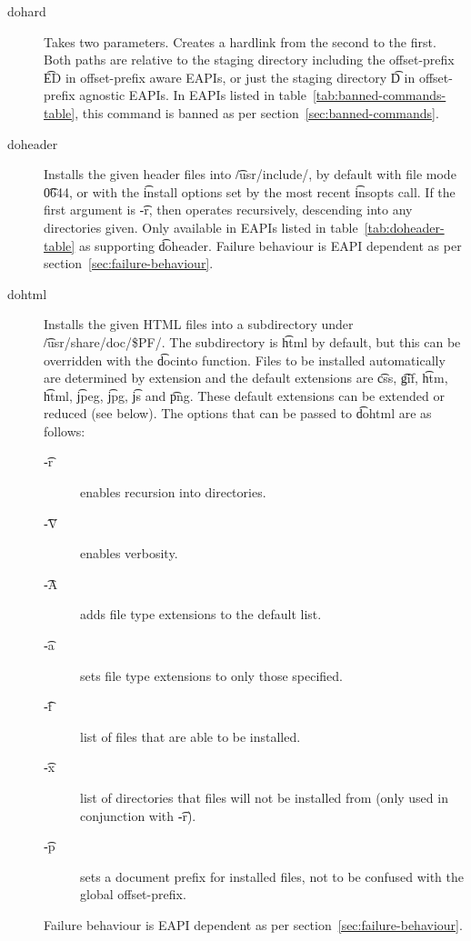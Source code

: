 \begin{description}
\item[dohard] Takes two parameters. Creates a hardlink from the second to the first. Both paths are
    relative to the staging directory including the offset-prefix \t{ED} in offset-prefix aware
    EAPIs, or just the staging directory \t{D} in offset-prefix agnostic EAPIs. In EAPIs listed
    in table~\ref{tab:banned-commands-table}, this command is banned as per
    section~\ref{sec:banned-commands}.

\item[doheader]  Installs the given header files into \t{/usr/include/},
    by default with file mode \t{0644}, or with the \t{install} options set by the most recent
    \t{insopts} call. If the first argument is \t{-r}, then operates recursively, descending
    into any directories given.
    Only available in EAPIs listed in table~\ref{tab:doheader-table} as supporting \t{doheader}.
    Failure behaviour is EAPI dependent as per section~\ref{sec:failure-behaviour}.

\item[dohtml] Installs the given HTML files into a subdirectory under \t{/usr/share/doc/\$PF/}.
    The subdirectory is \t{html} by default, but this can be overridden with the \t{docinto}
    function. Files to be installed automatically are determined by extension and the default
    extensions are \t{css}, \t{gif}, \t{htm}, \t{html}, \t{jpeg}, \t{jpg}, \t{js} and \t{png}.
    These default extensions can be extended or reduced (see below). The options that can be passed
    to \t{dohtml} are as follows:
    \begin{description}
    \item[\t{-r}] enables recursion into directories.
    \item[\t{-V}] enables verbosity.
    \item[\t{-A}] adds file type extensions to the default list.
    \item[\t{-a}] sets file type extensions to only those specified.
    \item[\t{-f}] list of files that are able to be installed.
    \item[\t{-x}] list of directories that files will not be installed from (only used in
        conjunction with \t{-r}).
    \item[\t{-p}] sets a document prefix for installed files, not to be confused with the global
        offset-prefix.
    \end{description}

    Failure behaviour is EAPI dependent as per section~\ref{sec:failure-behaviour}.


\end{description}
